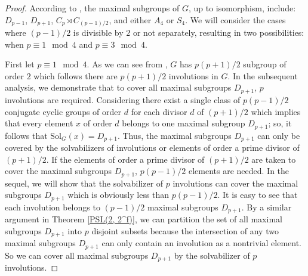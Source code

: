 \documentclass{amsart}
\newcommand{\Solv}{\text{Sol}}
\theoremstyle{definition}
\theoremstyle{remark}
\begin{document}
\begin{proof}
According to \cite[Theorem 2.2]{Giudici}, the maximal subgroups of $G$, up to isomorphism, include: $D_{p-1}$, $D_{p+1}$, ${C_p}\rtimes C_{(p-1)/2}$, and either $A_4$ or $S_4$. We will consider the cases where $(p-1)/2$ is divisible by $2$ or not separately, resulting in two possibilities: when $p \equiv 1 \mod 4$ and $p \equiv 3 \mod 4$.

First let $p \equiv 1 \mod 4$. As we can see from \cite[Theorem 2.1]{King}, $G$ has $p(p+1)/2$ subgroup of order $2$ which follows there are $p(p+1)/2$ involutions in $G$. In the subsequent analysis, we demonstrate that to cover all maximal subgroups $D_{p+1}$, $p$ involutions are required. Considering \cite[Theorem 2.1]{King} there exist a single class of $p(p-1)/2$ conjugate cyclic groups of order $d$ for each divisor $d$ of $(p+1)/2$ which implies that every element $x$ of order $d$ belongs to one maximal subgroup $D_{p+1}$; so, it follows that $\Solv_G(x)=D_{p+1}$. Thus, the maximal subgroups $D_{p+1}$ can only be covered by the solvabilizers of involutions or elements of order a prime divisor of $(p+1)/2$. If the elements of order a prime divisor of $(p+1)/2$ are taken to cover the maximal subgroups $D_{p+1}$, $p(p-1)/2$ elements are needed. In the sequel, we will show that the solvabilizer of $p$ involutions can cover the maximal subgroups $D_{p+1}$ which is obviously less than $p(p-1)/2$. It is easy to see that each involution belongs to $(p-1)/2$ maximal subgroups $D_{p+1}$. By a similar argument in Theorem \ref{PSL(2, 2^f)}, we can partition the set of all maximal subgroups $D_{p+1}$ into $p$ disjoint subsets because the intersection of any two maximal subgroups $D_{p+1}$ can only contain an involution as a nontrivial element. So we can cover all maximal subgroups $D_{p+1}$ by the solvabilizer of $p$ involutions.


\end{proof}
\end{document}

